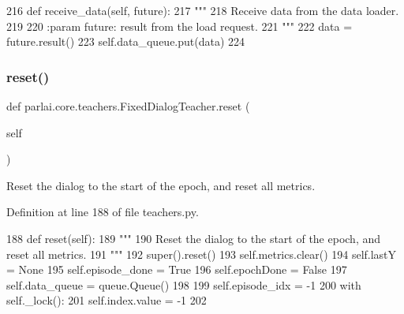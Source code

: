 \begin{DoxyCode}
216     \textcolor{keyword}{def }receive\_data(self, future):
217         \textcolor{stringliteral}{"""}
218 \textcolor{stringliteral}{        Receive data from the data loader.}
219 \textcolor{stringliteral}{}
220 \textcolor{stringliteral}{        :param future: result from the load request.}
221 \textcolor{stringliteral}{        """}
222         data = future.result()
223         self.data\_queue.put(data)
224 
\end{DoxyCode}
\mbox{\label{classparlai_1_1core_1_1teachers_1_1FixedDialogTeacher_af0e1160f17d43ace896f71c190e4e5ec}} 
\subsubsection{\texorpdfstring{reset()}{reset()}}
{\footnotesize\ttfamily def parlai.\+core.\+teachers.\+Fixed\+Dialog\+Teacher.\+reset (\begin{DoxyParamCaption}\item[{}]{self }\end{DoxyParamCaption})}

\begin{DoxyVerb}Reset the dialog to the start of the epoch, and reset all metrics.
\end{DoxyVerb}
 

Definition at line 188 of file teachers.\+py.


\begin{DoxyCode}
188     \textcolor{keyword}{def }reset(self):
189         \textcolor{stringliteral}{"""}
190 \textcolor{stringliteral}{        Reset the dialog to the start of the epoch, and reset all metrics.}
191 \textcolor{stringliteral}{        """}
192         super().reset()
193         self.metrics.clear()
194         self.lastY = \textcolor{keywordtype}{None}
195         self.episode\_done = \textcolor{keyword}{True}
196         self.epochDone = \textcolor{keyword}{False}
197         self.data\_queue = queue.Queue()
198 
199         self.episode\_idx = -1
200         with self.\_lock():
201             self.index.value = -1
202 
\end{DoxyCode}
\mbox{\label{classparlai_1_1core_1_1teachers_1_1FixedDialogTeacher_af1501d26676b7cf0ed8f41d51c31e686}} 
